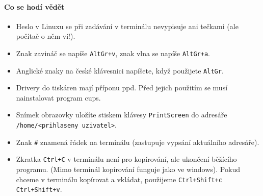 \paragraph{Co se hodí vědět }

\begin{itemize}
	
	
\item Heslo v Linuxu se při zadávání v terminálu nevypisuje ani tečkami (ale počítač o něm ví!). 

\item Znak zavináč se napíše {\tt AltGr+v}, znak vlna se napíše {\tt AltGr+a}.

\item Anglické znaky na české klávesnici napíšete, když použijete {\tt AltGr}. 

\item Drivery do tiskáren mají příponu ppd. Před jejich použitím se musí nainstalovat program cups. 

\item Snímek obrazovky uložíte stiskem klávesy {\tt PrintScreen} do adresáře 
{\tt /home/<prihlaseny uzivatel>}. 

\item Znak {\tt \#} znamená řádek na terminálu (zastupuje vypsání aktuálního adresáře). 

\item Zkratka {\tt Ctrl+C} v terminálu není pro kopírování, ale ukončení běžícího programu. (Mimo terminál kopírování funguje jako ve windows). Pokud chceme v terminálu kopírovat a vkládat, použijeme {\tt Ctrl+Shift+c}  {\tt Ctrl+Shift+v}.

	
\end{itemize}


